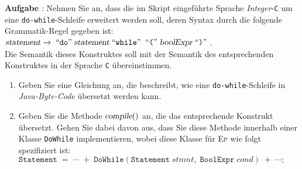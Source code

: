 \documentclass{article}
\newcounter{aufgabe}
\newcommand{\quoted}[1]{\;\mbox{``\texttt{#1}''}\;}
\newcommand{\exercise}{\vspace*{0.1cm}

\stepcounter{aufgabe}
\vspace*{0.3cm}

\noindent
\textbf{Aufgabe \arabic{aufgabe}}: }
\begin{document}
\exercise
Nehmen Sie an, dass die im Skript eingef\"uhrte Sprache \textsl{Integer}-\texttt{C} um eine 
\texttt{do-while}-Schleife erweitert werden soll, deren Syntax durch die folgende Grammatik-Regel gegeben ist:
\\[0.2cm]
\hspace*{1.3cm}
$\textsl{statement} \rightarrow \quoted{do} \textsl{statement} \quoted{while}
 \quoted{(} \textsl{boolExpr} \quoted{)}$.
\\[0.2cm]
Die Semantik dieses Konstruktes soll mit der Semantik des entsprechenden Konstruktes in
der Sprache \texttt{C} \"ubereinstimmen.
\begin{enumerate}
\item Geben Sie eine Gleichung an, die beschreibt, wie eine \texttt{do-while}-Schleife in
      \textsl{Java-Byte-Code} \"ubersetzt werden kann.
\item Geben Sie die Methode $\textsl{compile}()$ an, die das entsprechende
      Konstrukt \"ubersetzt.  Gehen Sie dabei davon aus, dass Sie diese Methode innerhalb
      einer Klasse \texttt{DoWhile} implementieren, wobei diese Klasse f\"ur \textsc{Ep}
      wie folgt spezifiziert ist:
      \\[0.2cm]
      \hspace*{1.3cm}
      $\texttt{Statement} \;=\; \cdots \;+\; \texttt{DoWhile}(\texttt{Statement}\; stmnt,\;
      \mathtt{BoolExpr}\; cond)\; +\; \cdots; $      
\end{enumerate}
\end{document}

